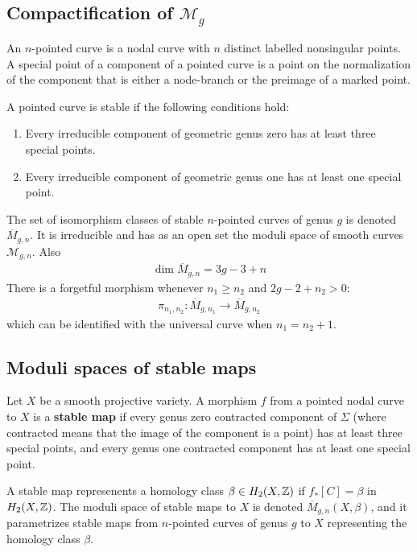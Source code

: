 \documentclass[12pt]{article}
\begin{document}
\subsection{Compactification of $\mathcal{M}_g$}

\begin{definition}
    An $n$-pointed curve is a nodal curve with $n$ distinct labelled nonsingular points. A special point of a component of a pointed curve is a point on the normalization of the component that is either a node-branch or the preimage of a marked point. 

    A pointed curve is stable if the following conditions hold:
    \begin{enumerate}
        \item Every irreducible component of geometric genus zero has at least three special points.
        \item Every irreducible component of geometric genus one has at least one special point.
    \end{enumerate}
\end{definition}
The set of isomorphism classes of stable $n$-pointed curves of genus $g$ is denoted $\overline{M}_{g,n}$. It is irreducible and has as an open set the moduli space of smooth curves $\mathcal{M}_{g,n}$. Also \begin{align*}
    \dim \overline{M}_{g,n} = 3g - 3 + n
\end{align*}
There is a forgetful morphism whenever $n_1 \geq n_2$ and $2g - 2 + n_2 > 0$: \begin{align*}
    \pi_{n_1,n_2} : \overline{M}_{g,n_1} \to \overline{M}_{g,n_2}
\end{align*} which can be identified with the universal curve when $n_1 = n_2 + 1$.


\subsection{Moduli spaces of stable maps}
\begin{definition}
    Let $X$ be a smooth projective variety. A morphism $f$ from a pointed nodal curve to $X$ is a \textbf{stable map }if every genus zero contracted component of $\Sigma$ (where contracted means that the image of the component is a point) has at least three special points, and every genus one contracted component has at least one special point.
\end{definition}

\begin{definition}
    A stable map represenents a homology class $\beta \in H_2(X,\mathbb{Z})$ if $f_*[C] = \beta$ in $H_2(X,\mathbb{Z})$. The moduli space of stable maps to $X$ is denoted $\overline{M}_{g,n}(X,\beta)$, and it parametrizes stable maps from $n$-pointed curves of genus $g$ to $X$ representing the homology class $\beta$.
\end{definition}
\end{document}

